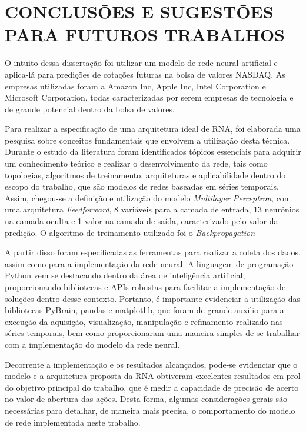 
\chapter{CONCLUSÕES E SUGESTÕES PARA FUTUROS TRABALHOS}\label{ch:conclusao}
O intuito dessa dissertação foi utilizar um modelo de rede neural artificial e aplica-lá para predições de cotações futuras na bolsa de valores NASDAQ. As empresas utilizadas foram a Amazon Inc, Apple Inc, Intel Corporation e Microsoft Corporation, todas caracterizadas por serem empresas de tecnologia e de grande potencial dentro da bolsa de valores.

Para realizar a especificação de uma arquitetura ideal de RNA, foi elaborada uma pesquisa sobre conceitos fundamentais que envolvem a utilização desta técnica. Durante o estudo da literatura foram identificados tópicos essenciais para adquirir um conhecimento teórico e realizar o desenvolvimento da rede, tais como topologias, algoritmos de treinamento, arquiteturas e aplicabilidade dentro do escopo do trabalho, que são modelos de redes baseadas em séries temporais. Assim, chegou-se a definição e utilização do modelo \textit{Multilayer Perceptron}, com uma arquitetura \textit{Feedforward}, 8 variáveis para a camada de entrada, 13 neurônios na camada oculta e 1 valor na camada de saída, caracterizado pelo valor da predição. O algoritmo de treinamento utilizado foi o \textit{Backpropagation} 

A partir disso foram especificadas as ferramentas para realizar a coleta dos dados, assim como para a implementação da rede neural. A linguagem de programação Python vem se destacando dentro da área de inteligência artificial, proporcionando bibliotecas e APIs robustas para facilitar a implementação de soluções dentro desse contexto. Portanto, é importante evidenciar a utilização das bibliotecas PyBrain, pandas e matplotlib, que foram de grande auxilio para a execução da aquisição, visualização, manipulação e refinamento realizado nas séries temporais, bem como proporcionaram uma maneira simples de se trabalhar com a implementação do modelo da rede neural.

Decorrente a implementação e os resultados alcançados, pode-se evidenciar que o modelo e a arquitetura proposta da RNA obtiveram excelentes resultados em prol do objetivo principal do trabalho, que é medir a capacidade de precisão de acerto no valor de abertura das ações. Desta forma, algumas considerações gerais são necessárias para detalhar, de maneira mais precisa, o comportamento do modelo de rede implementada neste trabalho.

